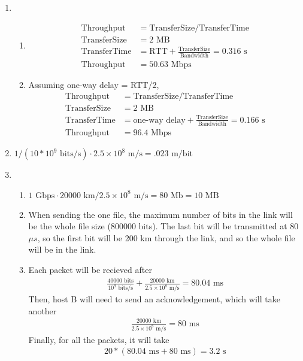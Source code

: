 \documentclass{article}
\begin{document}
\begin{enumerate}
        \item
        \begin{enumerate}
            \item 
            \begin{align*}
                \text{Throughput} &= \text{TransferSize}/\text{TransferTime}\\
                \text{TransferSize} &= 2 \text{ MB} \\
                \text{TransferTime} &= \text{RTT} + \frac{\text{TransferSize}}{\text{Bandwidth}} = 0.316 \text{ s}\\
                \text{Throughput} &= \boxed{50.63 \text{ Mbps}}
            \end{align*}
            \item Assuming one-way delay = RTT/2,
            \begin{align*}
                \text{Throughput} &= \text{TransferSize}/\text{TransferTime}\\
                \text{TransferSize} &= 2 \text{ MB} \\
                \text{TransferTime} &= \text{one-way delay} + \frac{\text{TransferSize}}{\text{Bandwidth}} = 0.166 \text{ s}\\
                \text{Throughput} &= \boxed{96.4 \text{ Mbps}}
            \end{align*}
        \end{enumerate}

        \item $1/(10*10^9 \text{ bits/s}) \cdot 2.5 \times 10^8 \text{ m/s} = \boxed{.023 \text{ m/bit}}$

        \item 
        \begin{enumerate}
            \item $1 \text{ Gbps} \cdot 20000 \text{ km} / 2.5 \times 10^8 \text{ m/s} = 80 \text{ Mb} = \boxed{10 \text{ MB}}$
            \item When sending the one file, the maximum number of bits in the link will be
            the whole file size (800000 bits). The last bit will be transmitted at 80 $\mu s$, so the first bit will be 
            200 km through the link, and so the whole file will be in the link.
            \item Each packet will be recieved after
            \begin{align*}
                \frac{40000 \text{ bits}}{10^9 \text{ bits/s}} + \frac{20000 \text{ km}}{2.5 \times 10^8 \text{ m/s}} =  80.04 \text{ ms}
            \end{align*}
            Then, host B will need to send an acknowledgement, which will take another
            \begin{align*}
                \frac{20000 \text{ km}}{2.5 \times 10^8 \text{ m/s}} = 80 \text{ ms}
            \end{align*}
            Finally, for all the packets, it will take
            \begin{align*}
                20*(80.04 \text{ ms} + 80 \text{ ms}) = \boxed{3.2 \text{ s}}
            \end{align*}


\end{enumerate}
\end{enumerate}
\end{document}
